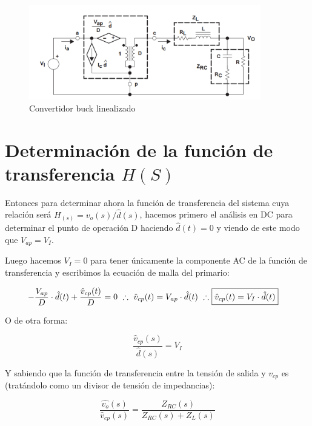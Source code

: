 \documentclass[12pt]{report}
\begin{document}
	\begin{figure}[H]
		\centering
		\includegraphics[width=0.9\textwidth,height=\textheight,keepaspectratio]{buck_control_full_equivalent}
		\caption{Convertidor buck linealizado}
	\end{figure}

\section{Determinación de la función de transferencia $H(S)$}

	Entonces para determinar ahora la función de transferencia del sistema cuya relación será $H_{(s)} = v_{o}(s)/\hat{d}(s)$, hacemos primero el análisis en DC para determinar el punto de operación D haciendo $\hat{d}(t) = 0$ y viendo de este modo que $V_{ap} = V_I$. 
	
	Luego hacemos $V_I = 0$ para tener únicamente la componente AC de la función de transferencia y escribimos la ecuación de malla del primario:
	
	\begin{equation}
	\begin{aligned}
	-\dfrac{V_{ap}}{D} \cdot \hat{d}(t) + \dfrac{\hat{v}_{cp}(t)}{D} = 0 \ \therefore \ \hat{v}_{cp}(t) = V_{ap} \cdot \hat{d}(t) \ \therefore \ \Aboxed{\hat{v}_{cp}(t) = V_I \cdot \hat{d}(t)}
	\end{aligned}
	\end{equation}
	
	O de otra forma:
	
	\begin{equation}
	\dfrac{\hat{v}_{cp}(s)}{\hat{d}(s)} = V_I
	\end{equation}
	
	Y sabiendo que la función de transferencia entre la tensión de salida y $v_{cp}$ es (tratándolo como un divisor de tensión de impedancias):
	
	\begin{equation}
	\dfrac{\hat{v_o}(s)}{\hat{v}_{cp}(s)} = \dfrac{Z_{RC}(s)}{Z_{RC}(s) + Z_L(s)}
	\end{equation}
	
\end{document}
